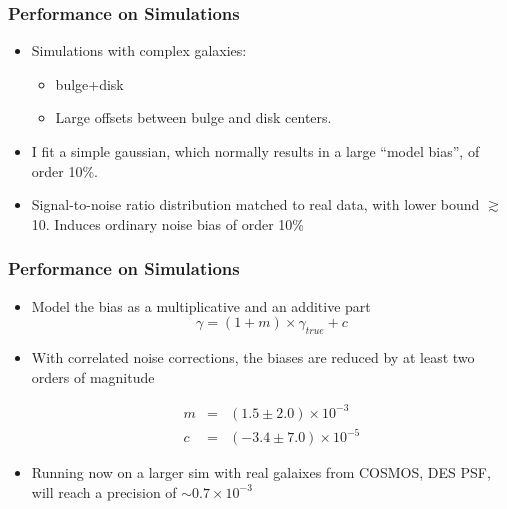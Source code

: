 \documentclass{beamer}
\begin{document}
\frame
{
    \frametitle{Performance on Simulations}

 
    \begin{itemize}
        \item Simulations with complex galaxies:
            \begin{itemize}
                \item bulge+disk
                \item Large offsets between bulge and disk centers.
            \end{itemize}

        \item I fit a simple gaussian, which normally results in a large
            ``model bias'', of order 10\%.
            
         \item Signal-to-noise ratio distribution matched to real data, with
             lower bound $\gtrsim$10.  Induces ordinary noise bias of order
             10\%

    \end{itemize}

}

\frame
{
    \frametitle{Performance on Simulations}

 
    \begin{itemize}
            
            
         \item Model the bias as a multiplicative and an additive part
        {\color{lightskyblue} 
            \begin{equation}
                \gamma = (1 + m ) \times \gamma_{true} + c \nonumber
            \end{equation}
        }


         \item With correlated noise corrections, the biases are reduced
             by at least two orders of magnitude

        {\color{gold} 
            \begin{eqnarray}
                m & = & (1.5 \pm 2.0) \times 10^{-3} \nonumber \\
                c & = & (-3.4 \pm 7.0) \times 10^{-5} \nonumber
            \end{eqnarray}
        }
         \item Running now on a larger sim with real galaixes from COSMOS, DES PSF,
            will reach a precision of $\sim 0.7 \times 10^{-3}$

    \end{itemize}

}
\end{document}

